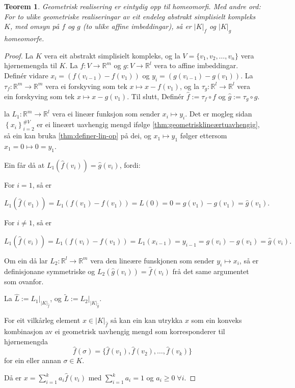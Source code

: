 \documentclass[a4paper, 12pt, norsk]{article}
\theoremstyle{plain}
\newtheorem{theorem}{Teorem}[section]
\theoremstyle{definition}
\newcommand{\Rb}{\mathbb{R}}
\newcommand{\gr}[1]{ \lvert #1 \rvert } %
\newcommand{\set}[1]{ \left\{ #1 \right\} } %
\begin{document}
\begin{theorem} \label{thm:gr-eintydig}
	Geometrisk realisering er eintydig opp til homeomorfi. Med andre ord: For to ulike geometriske realiseringar av eit endeleg abstrakt simplisielt kompleks $K$, med omsyn på $f$ og $g$ (to ulike affine imbeddingar), så er $\gr{K}_f$ og $\gr{K}_g$ homeomorfe.
\end{theorem}

\begin{proof}
	La $K$ vera eit abstrakt simplisielt kompleks, og la $V=\{ v_1, v_2, \dots, v_n \}$ vera hjørnemengda til $K$. La $f:V\to\Rb^m$ og $g:V\to\Rb^l$ vera to affine imbeddingar. Definér vidare $x_i=(f(v_{i-1})-f(v_1))$ og $y_i=(g(v_{i-1})-g(v_1))$. La $\tau_f:\Rb^m\to\Rb^m$ vera ei forskyving som tek $x\mapsto x-f(v_1)$, og la $\tau_g:\Rb^l\to\Rb^l$ vera ein forskyving som tek $x\mapsto x-g(v_1)$. Til slutt, Definér $\hat{f}:=\tau_f\circ f$ og $\hat{g}:=\tau_g \circ g$.
	
	la $L_1:\Rb^m\to\Rb^l$ vera ei lineær funksjon som sender $x_i\mapsto y_i$. Det er mogleg sidan \( \set{x_i}_{i=2}^{\#V} \) er ei lineært uavhengig mengd ifølge \autoref{thm:geometrisklineærtuavhengig}, så ein kan bruka \autoref{thm:definer-lin-op} på dei, og \( x_1 \mapsto y_1 \) følger ettersom \( x_1 = 0 \mapsto 0 = y_1 \).

	Ein får då at $L_1(\hat{f}(v_i))=\hat{g}(v_i)$, fordi:
	
	For $i=1$, så er

	\[
		L_1(\hat{f}(v_1))=L_1(f(v_1)-f(v_1))=L(0)=0=g(v_1)-g(v_1)=\hat{g}(v_1).
	\]

	For $i\neq 1$, så er

	\[
		L_1(\hat{f}(v_i))=L_1(f(v_i)-f(v_1))=L_1(x_{i-1})=y_{i-1}=g(v_i)-g(v_1)=\hat{g}(v_i).
	\]

	Om ein då lar $L_2:\Rb^l\to\Rb^m$ vera den lineære funskjonen som sender $y_i\mapsto x_i$, så er definisjonane symmetriske og \( L_2(\hat{g}(v_i))=\hat{f}(v_i) \) frå det same argumentet som ovanfor.

	La $\hat{L} := L_1|_{\gr{K}_{\hat{f}}}$, og $\tilde{L} := L_2|_{\gr{K}_{\hat{g}}}$.

	For eit vilkårleg element $x\in\gr{K}_{\hat{f}}$ så kan ein kan utrykka $x$ som ein konveks kombinasjon av ei geometrisk uavhengig mengd som korresponderer til hjørnemengda 
	\[ 
		\hat{f}(\sigma) = \{\hat{f}(v_1), \hat{f}(v_2), \dots, \hat{f}(v_k)\}
	\] 
	for ein eller annan \( \sigma \in K \).
	
	Då er $x=\sum_{i=1}^ka_i\hat{f}(v_i)$ med $\sum_{i=1}^ka_i=1$ og $a_i\geq0\; \forall i$. 
	

\end{proof}
\end{document}
